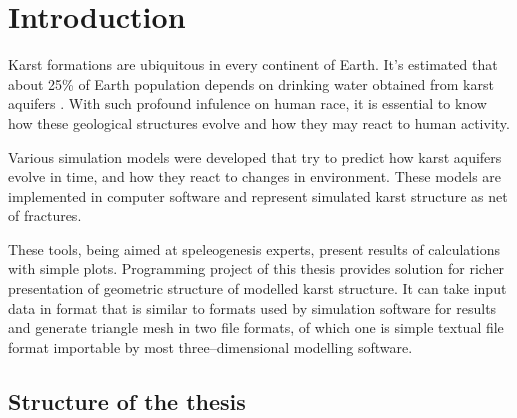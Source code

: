 \chapter{Introduction}

%




Karst formations are ubiquitous in every continent of Earth. It's estimated that
about 25\% of Earth population depends on drinking water obtained from karst
aquifers \parencite{ford2007karst}. With such profound infulence on human race,
it is essential to know how these geological structures evolve and how they may
react to human activity.

Various simulation models were developed that try to predict how karst aquifers
evolve in time, and how they react to changes in environment. These models are
implemented in computer software and represent simulated karst structure as
net of fractures.

These tools, being aimed at speleogenesis experts, present results of
calculations with simple plots. Programming project of this thesis provides
solution for richer presentation of geometric structure of modelled karst
structure. It can take input data in format that is similar to formats used by
simulation software for results and generate triangle mesh in two file formats,
of which one is simple textual file format importable by most three--dimensional
modelling software.
\section{Structure of the thesis}
